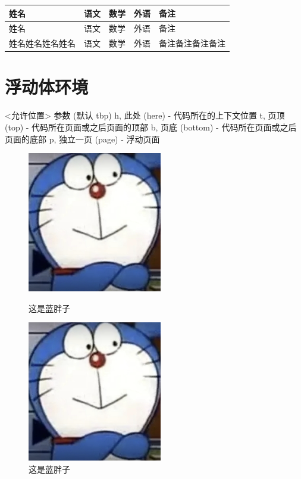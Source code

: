 \documentclass[8pt]{article}
\begin{document}
	\begin{tabular}{| l || c | c | c |p{1.5cm}|}
	\hline
		姓名 & 语文 & 数学 & 外语 & 备注 \\
		\hline
		姓名 & 语文 & 数学 & 外语 & 备注 \\
		\hline
		姓名姓名姓名姓名 & 语文 & 数学 & 外语 & 备注备注备注备注 \\
		\hline
	\end{tabular}

	
	
	\section{浮动体环境}
	
	<允许位置> 参数 (默认 tbp)
	h, 此处 (here) - 代码所在的上下文位置
	t, 页顶 (top) - 代码所在页面或之后页面的顶部
	b, 页底 (bottom) - 代码所在页面或之后页面的底部
	p, 独立一页 (page) - 浮动页面
	\begin{figure}[h]
		\centering
		\includegraphics[scale=0.3]{123.png}
		\caption{这是蓝胖子}
		\includegraphics[scale=0.3]{123.png}
		\caption{这是蓝胖子} 
	\end{figure}
	
\end{document}
